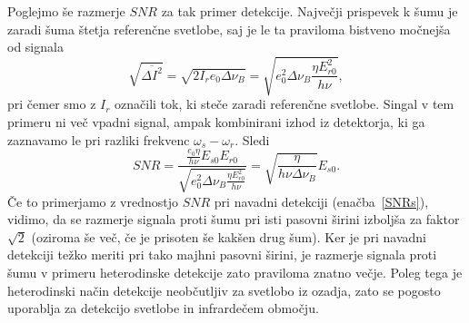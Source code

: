 Poglejmo še razmerje $SNR$ za tak primer detekcije. Največji prispevek k šumu je 
zaradi šuma štetja referenčne svetlobe, saj je le ta praviloma bistveno močnejša od signala
\begin{equation}
\sqrt{\overline{\Delta I^2}} = \sqrt{2I_re_0 \Delta\nu_B}=\sqrt{
 e_0^2\Delta\nu_B\frac{\eta E_{r0}^2}{h\nu}},
\end{equation}
pri čemer smo z $I_r$ označili tok, ki steče zaradi referenčne svetlobe. Singal v tem 
primeru ni več vpadni signal, ampak kombinirani izhod iz detektorja, ki ga zaznavamo
le pri razliki frekvenc $\omega_s-\omega_r$. Sledi
\begin{equation}
SNR = \frac{\frac{e_0 \eta}{h \nu} E_{s0}E_{r0}}{\sqrt{
 e_0^2\Delta\nu_B\frac{\eta E_{r0}^2}{h\nu}}} = \sqrt{\frac{\eta}{h \nu \Delta\nu_B}}E_{s0}.
\end{equation}
Če to primerjamo z vrednostjo $SNR$ pri navadni detekciji (enačba~\ref{SNRs}), vidimo, 
da se razmerje signala proti šumu pri isti pasovni širini izboljša za faktor $\sqrt{2}$
(oziroma še več, če je prisoten še kakšen drug šum).
Ker je pri navadni detekciji težko meriti pri tako majhni pasovni širini, je razmerje
signala proti šumu v primeru heterodinske detekcije zato praviloma znatno večje. Poleg tega
je heterodinski način detekcije neobčutljiv za svetlobo iz ozadja, zato se pogosto 
uporablja za detekcijo svetlobe in infrardečem območju. 
